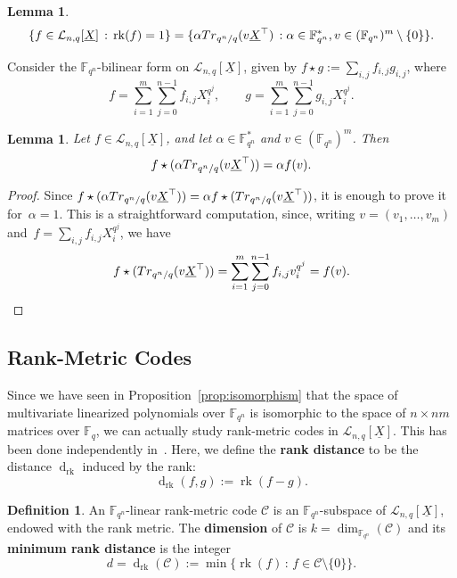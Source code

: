 \documentclass[11pt]{article}
\newtheorem{lemma}[theo]{Lemma}
\theoremstyle{definition}
\newtheorem{defi}[theo]{Definition}
\numberwithin{equation}{section}
\DeclareMathOperator{\rk}{rk}
\DeclareMathOperator{\dd}{d}
\begin{document}
\begin{lemma}\label{lem:rankone}
 $$\{f \in \mathcal{L}_{n,q}[\underline{X}] \,:\, \rk(f)=1\}=\{\alpha {\rm Tr}_{q^n/q}(v \underline{X}^\top ) \,: \alpha \in {\mathbb F}_{q^n}^*, v \in ({\mathbb F}_{q^n})^m\setminus \{0\}\}. $$
\end{lemma}

Consider the ${\mathbb F}_{q^n}$-bilinear form on $\mathcal{L}_{n,q}[\underline{X}]$, given by $f\star g:=\sum_{i,j}f_{i,j}g_{i,j}$, where
$$ f=\sum_{i=1}^m\sum_{j=0}^{n-1}f_{i,j}X_i^{q^j}, \qquad g=\sum_{i=1}^m\sum_{j=0}^{n-1}g_{i,j}X_i^{q^j}.$$

\begin{lemma}
Let $f \in \mathcal{L}_{n,q}[\underline{X}]$, and let $\alpha \in {\mathbb F}_{q^n}^*$ and $v \in ({\mathbb F}_{q^n})^m$. Then 
$$ f \star (\alpha {\rm Tr}_{q^n/q}(v \underline{X}^\top ))=\alpha f(v).$$
\end{lemma}

\begin{proof}
Since $ f \star (\alpha {\rm Tr}_{q^n/q}(v \underline{X}^\top ))=\alpha  f \star ( {\rm Tr}_{q^n/q}(v \underline{X}^\top ))$, it is enough to prove it for~$\alpha=1$. This is a straightforward computation, since, writing $v=(v_1,\ldots, v_m)$ and~$f=\sum_{i,j}f_{i,j}X_i^{q^j}$, we have 
$$  f \star ( {\rm Tr}_{q^n/q}(v \underline{X}^\top ))=\sum_{i=1}^m\sum_{j=0}^{n-1}f_{i,j}v_i^{q^j}=f(v).$$
\end{proof}

\subsection{Rank-Metric Codes}\label{Sec:2.3}
Since we have seen in Proposition~\ref{prop:isomorphism}  that the space of multivariate linearized polynomials over ${\mathbb F}_{q^n}$ is isomorphic to the space of $n\times nm$ matrices over $\mathbb{F}_q$, we can actually study rank-metric codes in $\mathcal{L}_{n,q}[\underline{X}]$. This has been done independently in~\cite{polverino2023divisible}. Here, we define the \textbf{rank distance}  to be the distance $\dd_{\rk}$ induced by the rank:
$$ \dd_{\rk}(f,g):=\rk(f-g).$$

\begin{defi}
An ${\mathbb F}_{q^n}$-linear rank-metric code $\mathcal{C}$ is an ${\mathbb F}_{q^n}$-subspace of $\mathcal{L}_{n,q}[\underline{X}]$, endowed with the rank metric. The \textbf{dimension} of $\mathcal{C}$ is $k=\dim_{{\mathbb F}_{q^n}}(\mathcal{C})$ and its \textbf{minimum rank distance} is the integer
$$d=\dd_{\rk}(\mathcal{C}):=\min\{\rk(f) \,:\, f \in \mathcal{C}\setminus\{0\}\}.$$
\end{defi}
\end{document}
